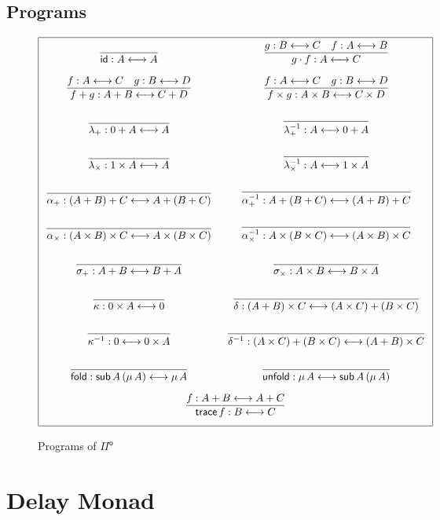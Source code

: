 \documentclass[runningheads]{llncs}
\newcommand{\Pio}{$\Pi^{\mathsf{o}}$}
\newcommand{\id}{\mathsf{id}}
\newcommand{\lr}{\longleftrightarrow}
\newcommand{\fold}{\mathsf{fold}}
\newcommand{\unfold}{\mathsf{unfold}}
\newcommand{\sub}{\mathsf{sub}}
\newcommand{\trace}{\mathsf{trace}}
\begin{document}
\subsection{Programs}

\begin{figure}
\[
\arraycolsep=8pt\def\arraystretch{2.8}
\begin{array}{|cc|}
\hline
\infer{\id : A \lr A}{}
& \infer{g \cdot f : A \lr C}{g : B \lr C & f : A \lr B} \\
\infer{f + g : A + B \lr C + D}{f : A \lr C & g : B \lr D} 
& \infer{f \times g : A \times B \lr C \times D}{f : A \lr C & g : B \lr D} \\
\infer{\lambda_{+} : 0 + A \lr A}{}
& \infer{\lambda_{+}^{-1} : A \lr 0 + A}{} \\
\infer{\lambda_{\times} : 1 \times A \lr A}{}
& \infer{\lambda_{\times}^{-1} : A \lr 1 \times A}{} \\
\infer{\alpha_{+} : (A + B) + C \lr A + (B + C)}{}
& \infer{\alpha_{+}^{-1} : A + (B + C) \lr (A + B) + C}{} \\
\infer{\alpha_{\times} : (A \times B) \times C \lr A \times (B \times C)}{}
& \infer{\alpha_{\times}^{-1} : A \times (B \times C) \lr (A \times B) \times C}{} \\
\infer{\sigma_{+} : A + B \lr B + A}{}
& \infer{\sigma_{\times} : A \times B \lr B \times A}{} \\
\infer{\kappa : 0 \times A \lr 0}{} 
& \infer{\delta : (A + B) \times C \lr (A \times C) + (B \times C)}{} \\
\infer{\kappa^{-1} : 0 \lr 0 \times A}{}
& \infer{\delta^{-1} : (A \times C) + (B \times C)  \lr (A + B) \times C}{} \\
\infer{\fold : \sub \, A \, (\mu \,A) \lr \mu \,A}{} 
& \infer{\unfold : \mu\,A \lr \sub \, A \, (\mu \,A)}{} \\
\multicolumn{2}{|c|}{\infer{\trace \,f: B \lr C}{f : A + B \lr A + C}} \\
\hline
\end{array}
\]
\caption{Programs of \Pio}
\label{fig:programs}
\end{figure}

\section{Delay Monad}\label{sec:delay}
\end{document}
